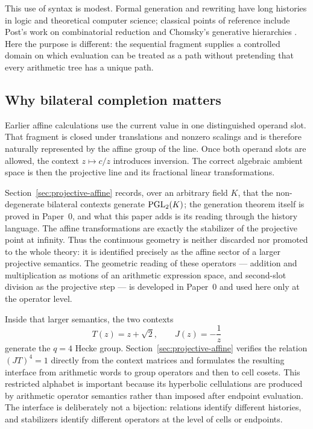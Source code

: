 This use of syntax is modest.  Formal generation and rewriting have long histories
in logic and theoretical computer science; classical points of reference include
Post's work on combinatorial reduction and Chomsky's generative hierarchies
\cite{Post1943FormalRO,Chomsky1956ThreeMF}.  Here the purpose is different: the
sequential fragment supplies a controlled domain on which evaluation can be treated
as a path without pretending that every arithmetic tree has a unique path.

\subsection{Why bilateral completion matters}

Earlier affine calculations use the current value in one distinguished operand slot.
That fragment is closed under translations and nonzero scalings and is therefore
naturally represented by the affine group of the line.  Once both operand slots are
allowed, the context $z\mapsto c/z$ introduces inversion.  The correct algebraic
ambient space is then the projective line and its fractional linear transformations.

Section~\ref{sec:projective-affine} records, over an arbitrary field $K$, that the
non-degenerate bilateral contexts generate $\operatorname{PGL}_2(K)$; the generation theorem
itself is proved in Paper~0, and what this paper adds is its reading through the
history language.  The affine transformations
are exactly the stabilizer of the projective point at infinity.  Thus the continuous
geometry is neither discarded nor promoted to the whole theory: it is identified
precisely as the affine sector of a larger projective semantics.  The geometric
reading of these operators --- addition and multiplication as motions of an
arithmetic expression space, and second-slot division as the projective step --- is
developed in Paper~0 and used here only at the operator level.

Inside that larger semantics, the two contexts
\[
  T(z)=z+\sqrt2,
  \qquad
  J(z)=-\frac1z
\]
generate the $q=4$ Hecke group.  Section~\ref{sec:projective-affine} verifies
the relation $(JT)^4=1$ directly from the context matrices and formulates the
resulting interface from arithmetic words to group operators and then to cell
cosets.  This restricted alphabet is important because its hyperbolic
cellulations are produced by arithmetic operator semantics rather than imposed
after endpoint evaluation.  The interface is deliberately not a bijection:
relations identify different histories, and stabilizers identify different
operators at the level of cells or endpoints.

